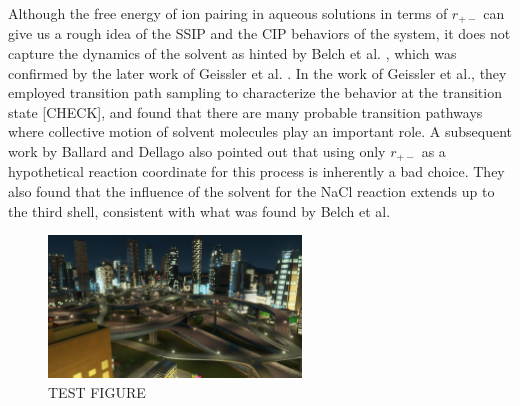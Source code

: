 \begin{spacing}{2.0}
    Although the free energy of ion pairing in aqueous solutions in terms of $r_{+-}$ can give us a rough idea of the SSIP and the CIP behaviors 
    of the system, it does not capture the dynamics of the solvent as hinted by Belch et al. \cite{P-JACS-1986-v108-Belch}, which was confirmed 
    by the later work of Geissler et al. \cite{P-JPhysChemB-1999-v103-Geissler}. In the work of Geissler et al., they employed transition path 
    sampling to characterize the behavior at the transition state [CHECK], and found that there are many probable transition pathways where 
    collective motion of solvent molecules play an important role. A subsequent work by Ballard and Dellago also pointed out that using only 
    $r_{+-}$ as a hypothetical reaction coordinate for this process is inherently a bad choice. \cite{P-JPhysChemB-2012-v116-Ballard} They also 
    found that the influence of the solvent for the NaCl reaction extends up to the third shell, consistent with what was found by Belch et al. 
    \cite{P-JACS-1986-v108-Belch}

    \begin{figure}[H]
        \centering
        \includegraphics[width=0.6\textwidth]{./figs/fig1-01}
        \caption{TEST FIGURE}
    \end{figure}


\end{spacing}
